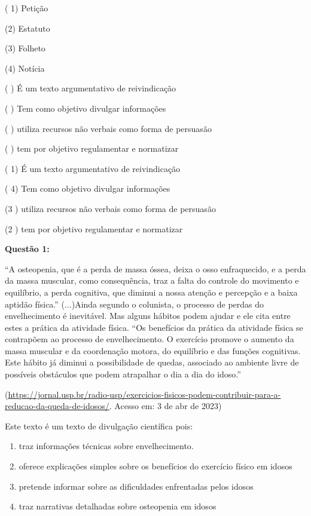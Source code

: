 {( 1) Petição

(2) Estatuto

(3) Folheto

(4) Notícia

( ) É um texto argumentativo de reivindicação

( ) Tem como objetivo divulgar informações

( ) utiliza recursos não verbais como forma de persuasão

( ) tem por objetivo regulamentar e normatizar

( 1) É um texto argumentativo de reivindicação

( 4) Tem como objetivo divulgar informações

(3 ) utiliza recursos não verbais como forma de persuasão

(2 ) tem por objetivo regulamentar e normatizar


\textbf{Questão 1:}

``A osteopenia, que é a perda de massa óssea, deixa o osso enfraquecido,
e a perda da massa muscular, como consequência, traz a falta do controle
do movimento e equilíbrio, a perda cognitiva, que diminui a nossa
atenção e percepção e a baixa aptidão física.'' (...)Ainda segundo o
colunista, o processo de perdas do envelhecimento é inevitável. Mas
alguns hábitos podem ajudar e ele cita entre estes a prática da
atividade física. ``Os benefícios da prática da atividade física se
contrapõem ao processo de envelhecimento. O exercício promove o aumento
da massa muscular e da coordenação motora, do equilíbrio e das funções
cognitivas. Este hábito já diminui a possibilidade de quedas, associado
ao ambiente livre de possíveis obstáculos que podem atrapalhar o dia a
dia do idoso.''

(\href{https://jornal.usp.br/radio-usp/exercicios-fisicos-podem-contribuir-para-a-reducao-da-queda-de-idosos/}{\uline{https://jornal.usp.br/radio-usp/exercicios-fisicos-podem-contribuir-para-a-reducao-da-queda-de-idosos/}}.
Acesso em: 3 de abr de 2023)

Este texto é um texto de divulgação científica pois:

\begin{enumerate}
\def\labelenumi{\alph{enumi})}
\item
  traz informações técnicas sobre envelhecimento.
\item
  oferece explicações simples sobre os benefícios do exercício físico em
  idosos
\item
  pretende informar sobre as dificuldades enfrentadas pelos idosos
\item
  traz narrativas detalhadas sobre osteopenia em idosos
\end{enumerate}

}
